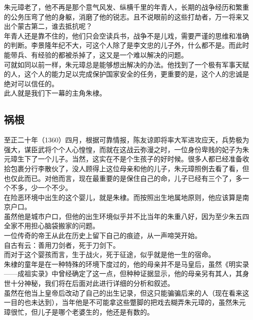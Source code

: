 \begin{multicols}{\theparacolNo}
朱元璋老了，他不再是那个意气风发、纵横千里的年青人，长期的战争经历和繁重的公务压弯了他的身躯，消磨了他的锐志。且不说眼前的这些打劫者，万一将来又出个蒙古第二，谁去抵抗呢？\\

年青人还是靠不住的，他们只会空读兵书，战争不是儿戏，需要严谨的思维和准确的判断。李景隆年纪不大，可这个人除了是李文忠的儿子外，什么都不是。而此时能带兵、有经验的都被杀掉了，这又是一个难以解决的问题。\\

可就如同以前一样，朱元璋总是能够想出解决的办法。他找到了一个极有军事天赋的人，这个人的能力足以完成保护国家安全的任务，更重要的是，这个人的忠诚是绝对可以信任的。\\

此人就是我们下一幕的主角朱棣。\\

\subsection{祸根}
至正二十年（1360）四月，根据可靠情报，陈友谅即将率大军进攻应天，兵势极为强大，谋臣武将个个人心惶惶，而就在这战云弥漫之时，一位身份卑贱的妃子为朱元璋生下了一个儿子。当然，这实在不是个生孩子的好时候。很多人都已经准备收拾包裹分行李散伙了，没人顾得上这位母亲和他的儿子，朱元璋照例去看了看，但也仅此而已。对他而言，现在最重要的是保住自己的命，儿子已经有三个了，多一个不多，少一个不少。\\

在险恶环境中出生的这个婴儿，就是朱棣。而按照出生地属地原则，他应该算是南京户口。\\

虽然他是城市户口，但他的出生环境似乎并不比当年的朱重八好，因为至少朱五四全家不用担心脑袋搬家的问题。\\

一位传奇的帝王从此在历史上留下自己的痕迹，从一声啼哭开始。\\

自古有云：善用刀剑者，死于刀剑下。\\

而对于这个婴孩而言，生于战火，死于征途，似乎就是他一生的宿命。\\

朱棣的童年是在一种特殊的环境下度过的，他的母亲并不是马皇后，虽然《明实录——成祖实录》中曾经确定了这一点，但种种证据显示，他的母亲另有其人，其身世十分神秘，我们将在后面对此进行详细的分析和叙述。\\

虽然在他当上皇帝后改动了自己的出生记录，但这只能骗骗后来的人（现在看来这一目的也未达到），当年他是不可能拿这些蹩脚的把戏去糊弄朱元璋的，虽然朱元璋很忙，但儿子是哪个老婆生的，他还是有数的。\\


\end{multicols}
